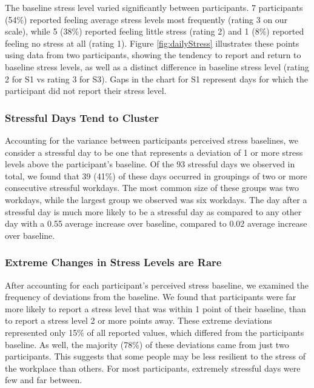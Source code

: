 The baseline stress level varied significantly between participants. 7
participants (54\%) reported feeling average stress levels most frequently
(rating 3 on our scale), while 5 (38\%) reported feeling little stress
(rating 2) and 1 (8\%) reported feeling no stress at all (rating 1). Figure \ref{fig:dailyStress} illustrates these points using  data from two participants, showing the tendency to report and return to baseline stress levels, as well
as a distinct difference in baseline stress level (rating 2 for S1 vs rating 3 for S3). Gaps in the chart for S1 represent days for which the participant did not report their stress level.


\subsubsection{Stressful Days Tend to Cluster}
Accounting for the variance between participants perceived stress
baselines, we consider a stressful day to be one that represents a
deviation of 1 or more stress levels above the participant's
baseline. Of the 93 stressful days we observed in total, we found that
39 (41\%) of these days occurred in groupings of two or more
consecutive stressful workdays. The most common size of these groups
was two workdays, while the largest group we observed was six
workdays.  The day after a stressful day is much more likely to be a
stressful day as compared to any other day with a 0.55 average increase
over baseline, compared to 0.02 average increase over baseline.

\subsubsection{Extreme Changes in Stress Levels are Rare}
After accounting for each participant's perceived stress baseline, we
examined the frequency of deviations from the baseline. We found that
participants were far more likely to report a stress level that was
within 1 point of their baseline, than to report a stress level 2 or
more points away. These extreme deviations represented only 15\% of
all reported values, which differed from the participants baseline. As
well, the majority (78\%) of these deviations came from just two
participants. This suggests that some people may be less resilient to
the stress of the workplace than others. For most participants,
extremely stressful days were few and far between.

